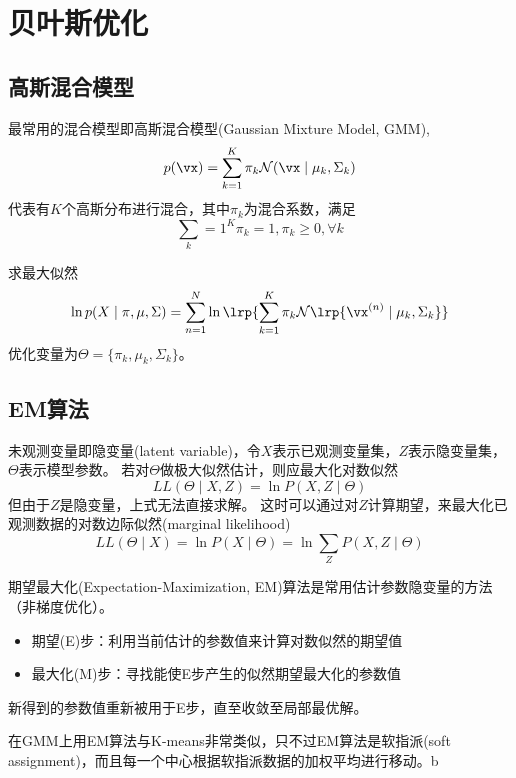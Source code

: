 
\section{贝叶斯优化}
\subsection{高斯混合模型}
最常用的混合模型即高斯混合模型(Gaussian Mixture Model, GMM),
\[p(\vx)=\sum_{k=1}^K\pi_k\mathcal{N}(\vx\mid\mu_k,\Sigma_k)\]
代表有$K$个高斯分布进行混合，其中$\pi_k$为混合系数，满足
\[\sum_{k}=1^K\pi_k=1,\pi_k\geq 0,\forall k\]

求最大似然
\[\ln p(X\mid\pi,\mu,\Sigma)=\sum_{n=1}^N\ln\lrp{\sum_{k=1}^K\pi_k\mathcal{N}\lrp{\vx^{(n)}\mid\mu_k,\Sigma_k}}\]
优化变量为$\Theta=\{\pi_k,\mu_k,\Sigma_k\}$。

\subsection{EM算法}
未观测变量即隐变量(latent variable)，令$X$表示已观测变量集，$Z$表示隐变量集，$\Theta$表示模型参数。
若对$\Theta$做极大似然估计，则应最大化对数似然
\[LL(\Theta\mid X,Z)=\ln P(X,Z\mid\Theta)\]
但由于$Z$是隐变量，上式无法直接求解。
这时可以通过对$Z$计算期望，来最大化已观测数据的对数边际似然(marginal likelihood)
\[LL(\Theta\mid X)=\ln P(X\mid\Theta)=\ln\sum_Z P(X,Z\mid\Theta)\]

期望最大化(Expectation-Maximization, EM)算法是常用估计参数隐变量的方法（非梯度优化）。
\begin{itemize}
	\item 期望(E)步：利用当前估计的参数值来计算对数似然的期望值
	\item 最大化(M)步：寻找能使E步产生的似然期望最大化的参数值
\end{itemize}
新得到的参数值重新被用于E步，直至收敛至局部最优解。

在GMM上用EM算法与K-means非常类似，只不过EM算法是软指派(soft assignment)，而且每一个中心根据软指派数据的加权平均进行移动。b